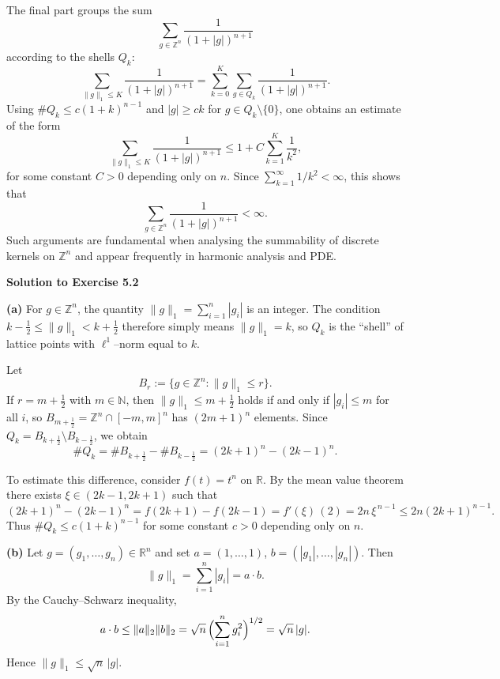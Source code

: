 \begin{problem}[CP-II-0358]
The final part groups the sum
\[
\sum_{g\in\mathbb{Z}^n} \frac{1}{(1+|g|)^{n+1}}
\]
according to the shells $Q_k$:
\[
\sum_{\|g\|_1\le K} \frac{1}{(1+|g|)^{n+1}}
= \sum_{k=0}^K \sum_{g\in Q_k} \frac{1}{(1+|g|)^{n+1}}.
\]
Using $\#Q_k\le c(1+k)^{n-1}$ and $|g|\ge c k$ for $g\in Q_k\setminus\{0\}$,
one obtains an estimate of the form
\[
\sum_{\|g\|_1\le K} \frac{1}{(1+|g|)^{n+1}}
\le 1 + C \sum_{k=1}^K \frac{1}{k^2},
\]
for some constant $C>0$ depending only on $n$.  Since
$\sum_{k=1}^\infty 1/k^2<\infty$, this shows that
\[
\sum_{g\in\mathbb{Z}^n} \frac{1}{(1+|g|)^{n+1}} < \infty.
\]
Such arguments are fundamental when analysing the summability of discrete
kernels on $\mathbb{Z}^n$ and appear frequently in harmonic analysis and
PDE.
\end{problem}

\begin{solution}

\par\medskip\noindent\textbf{Solution to Exercise 5.2}\par\smallskip


\par\medskip\noindent\textbf{(a)}\quad
For $g\in\mathbb{Z}^n$, the quantity $\|g\|_1=\sum_{i=1}^n|g_i|$ is an
integer.  The condition
$k-\tfrac12 \le \|g\|_1 < k+\tfrac12$ therefore simply means
$\|g\|_1=k$, so $Q_k$ is the ``shell'' of lattice points with
$\ell^1$--norm equal to $k$.

Let
\[
B_r := \{g\in\mathbb{Z}^n : \|g\|_1 \le r\}.
\]
If $r=m+\tfrac12$ with $m\in\mathbb{N}$, then
$\|g\|_1\le m+\tfrac12$ holds if and only if $|g_i|\le m$ for all $i$,
so $B_{m+\frac12}=\mathbb{Z}^n\cap[-m,m]^n$ has $(2m+1)^n$ elements.
Since $Q_k = B_{k+\frac12}\setminus B_{k-\frac12}$, we obtain
\[
\#Q_k = \#B_{k+\frac12} - \#B_{k-\frac12}
= (2k+1)^n - (2k-1)^n.
\]

To estimate this difference, consider $f(t)=t^n$ on $\mathbb{R}$.  By the
mean value theorem there exists $\xi\in(2k-1,2k+1)$ such that
\[
(2k+1)^n - (2k-1)^n
= f(2k+1)-f(2k-1)
= f'(\xi)\,(2)
= 2n\,\xi^{\,n-1}
\le 2n(2k+1)^{n-1}.
\]
Thus $\#Q_k\le c(1+k)^{n-1}$ for some constant $c>0$ depending only on
$n$.

\par\medskip\noindent\textbf{(b)}\quad
Let $g=(g_1,\dots,g_n)\in\mathbb{R}^n$ and set
$a=(1,\dots,1)$, $b=(|g_1|,\dots,|g_n|)$.  Then
\[
\|g\|_1 = \sum_{i=1}^n |g_i| = a\cdot b.
\]
By the Cauchy--Schwarz inequality,
\[
a\cdot b \le \|a\|_2 \|b\|_2
= \sqrt{n}\,\Bigl(\sum_{i=1}^n g_i^2\Bigr)^{1/2}
= \sqrt{n}\,|g|.
\]
Hence $\|g\|_1 \le \sqrt{n}\,|g|$.


\end{solution}
